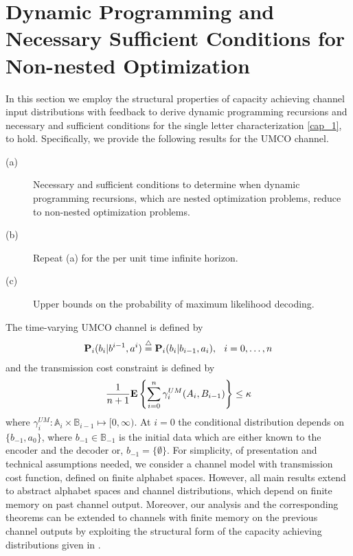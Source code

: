 \documentclass[11pt, a4paper, journal,onecolumn]{IEEEtran}
\newcommand{\mb}{\mathbb}
\newcommand{\sr}{\stackrel}
\newcommand{\tri}{\sr{\triangle}{=}}
\newcommand{\bea}{\begin{eqnarray}}
\newcommand{\eea}{\end{eqnarray}}
\newcommand{\hso}{\hspace{.1in}}
\begin{document}
%
%

\section{Dynamic Programming and Necessary Sufficient Conditions for Non-nested Optimization}
\label{UMCO}
In this section we employ the structural properties of capacity achieving channel input distributions with feedback to derive dynamic programming recursions and  necessary and sufficient conditions for the single letter characterization \eqref{cap_1}, to hold. Specifically, we provide the following results for the UMCO channel.
\begin{description}
\item[(a)] Necessary and sufficient conditions to determine when dynamic programming recursions, which are nested optimization problems, reduce to non-nested optimization problems. 

\item[(b)] Repeat (a) for the per unit time infinite horizon.

\item[(c)] Upper bounds on the probability of maximum likelihood decoding.
\end{description}
\par The time-varying UMCO channel is defined by
\begin{align}
{\bf P}_i(b_i|b^{i-1},a^i)\tri {\bf P}_i(b_i|b_{i-1},a_i), \hso i=0, \ldots, n  \label{UMCO_CHAN_SEC3}
\end{align}
and the transmission cost constraint is defined by 
\bea
\frac{1}{n+1}{\bf E}\left\{\sum_{i=0}^{n}{\gamma}^{UM}_i(A_i,B_{i-1})\right\}\leq \kappa \label{CC_UMCO_CHAN_SEC3} 
\eea
where ${\gamma}^{UM}_i:{\mb A}_{i}\times{\mb B}_{i-1}\longmapsto [0,\infty)$. At $i=0$ the conditional distribution depends on   $\{b_{-1}, a_0\}$, where $b_{-1} \in {\mb B}_{-1}$ is the initial data which are either known to the encoder and the decoder or, $b_{-1}=\{\emptyset\}$.
For simplicity, of presentation and technical assumptions needed, we consider a channel model with transmission cost function, defined on finite alphabet spaces. However, all main results extend to abstract alphabet spaces and channel distributions, which depend on finite memory on past channel output. Moreover, our analysis and the corresponding theorems  can be  extended to channels with finite memory on the previous channel outputs by exploiting the structural form of the capacity achieving  distributions given in \cite{kourtellaris2015information, kourtellarisISIT2016}.
\end{document}
